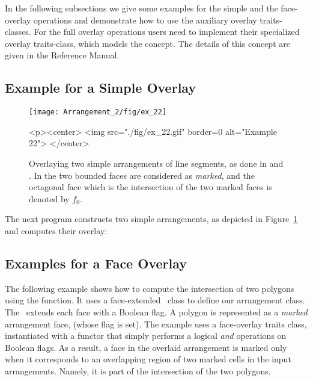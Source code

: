In the following subsections we give some examples for the simple and the
face-overlay operations and demonstrate how to use the auxiliary overlay
traits-classes. For the full overlay operations users need to implement
their specialized overlay traits-class, which models the 
concept. The details of this concept are given in the Reference Manual.

\subsection{Example for a Simple Overlay\label{arr_ssec:simp_ovl}}

\begin{figure}[t]
\begin{ccTexOnly}
  \begin{center}
  \texttt{[image: Arrangement\_2/fig/ex\_22]}
  \end{center}
\end{ccTexOnly}
\begin{ccHtmlOnly}
  <p><center>
  <img src="./fig/ex_22.gif" border=0 alt="Example 22">
  </center>
\end{ccHtmlOnly}
\caption{Overlaying two simple arrangements of line segments, as done
in  and .
In  the two bounded faces are
considered as {\em marked}, and the octagonal face which is the intersection
of the two marked faces is denoted by $f_0$.\label{arr_fig:ex_22}}
\end{figure}

The next program constructs two simple arrangements, as depicted in
Figure~\ref{arr_fig:ex_22} and computes their overlay:


\subsection{Examples for a Face Overlay\label{arr_ssec:face_ovl}}

The following example shows how to compute the intersection of two polygons
using the  function. It uses a face-extended \dcel\ class
to define our arrangement class. The \dcel\ extends each face with a Boolean 
flag. A polygon is represented as a {\sl marked} arrangement face, (whose
flag is set). The example uses a face-overlay traits class, instantiated with 
a functor that simply performs a logical {\em and} operations on Boolean flags.
As a result, a face in the overlaid arrangement is marked only when it
corresponds to an overlapping region of two marked cells in the input
arrangements. Namely, it is part of the intersection of the two polygons.

